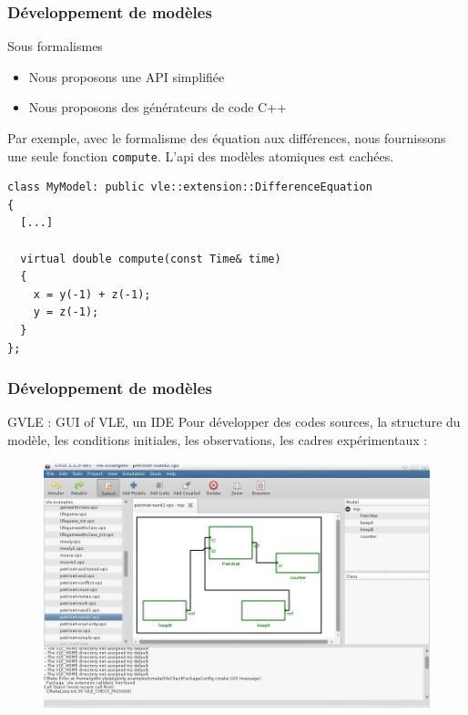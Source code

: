 \documentclass[xetex, compress, table, svgnames]{beamer}
\begin{document}
\begin{frame}[fragile]
  \frametitle{Développement de modèles}
  \begin{block}{Sous formalismes}
    \begin{itemize}
    \item Nous proposons une API simplifiée
    \item Nous proposons des générateurs de code C++
    \end{itemize}
  \end{block}
  \begin{exampleblock}{}
    Par exemple, avec le formalisme des équation aux différences, nous
    fournissons une seule fonction \texttt{compute}. L'api des modèles
    atomiques est cachées.
\begin{lstlisting}
class MyModel: public vle::extension::DifferenceEquation
{
  [...]

  virtual double compute(const Time& time)
  {
    x = y(-1) + z(-1);
    y = z(-1);
  }
};
\end{lstlisting}
  \end{exampleblock}
\end{frame}

\begin{frame}
  \frametitle{Développement de modèles}
  \begin{block}{GVLE : GUI of VLE, un IDE}
    Pour développer des codes sources, la structure du modèle, les
    conditions initiales, les observations, les cadres expérimentaux :
    \begin{figure}[htpb]
      \centering
      \includegraphics[width=.8\textwidth]{gvle}
    \end{figure}
  \end{block}
\end{frame}
\end{document}
